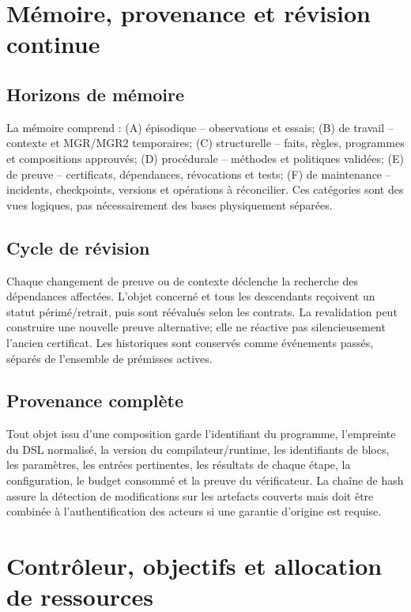 \documentclass[11pt,a4paper]{article}
\begin{document}
\section{Mémoire, provenance et révision continue}
\subsection{Horizons de mémoire}
La mémoire comprend : (A) épisodique -- observations et essais; (B) de travail -- contexte et MGR/MGR2 temporaires; (C) structurelle -- faits, règles, programmes et compositions approuvés; (D) procédurale -- méthodes et politiques validées; (E) de preuve -- certificats, dépendances, révocations et tests; (F) de maintenance -- incidents, checkpoints, versions et opérations à réconcilier. Ces catégories sont des vues logiques, pas nécessairement des bases physiquement séparées.

\subsection{Cycle de révision}
Chaque changement de preuve ou de contexte déclenche la recherche des dépendances affectées. L'objet concerné et tous les descendants reçoivent un statut périmé/retrait, puis sont réévalués selon les contrats. La revalidation peut construire une nouvelle preuve alternative; elle ne réactive pas silencieusement l'ancien certificat. Les historiques sont conservés comme événements passés, séparés de l'ensemble de prémisses actives.

\subsection{Provenance complète}
Tout objet issu d'une composition garde l'identifiant du programme, l'empreinte du DSL normalisé, la version du compilateur/runtime, les identifiants de blocs, les paramètres, les entrées pertinentes, les résultats de chaque étape, la configuration, le budget consommé et la preuve du vérificateur. La chaîne de hash assure la détection de modifications sur les artefacts couverts mais doit être combinée à l'authentification des acteurs si une garantie d'origine est requise.

\section{Contrôleur, objectifs et allocation de ressources}
\end{document}
